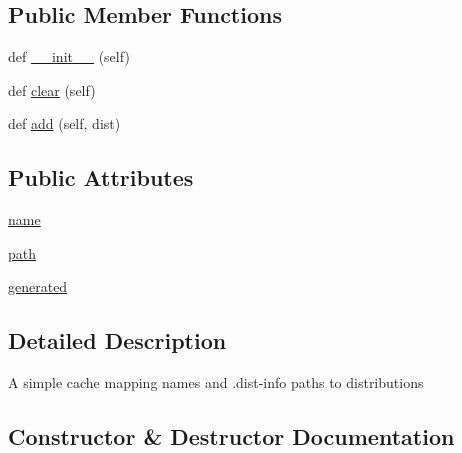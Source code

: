 \subsection*{Public Member Functions}
\begin{DoxyCompactItemize}
\item 
def \hyperlink{classpip_1_1__vendor_1_1distlib_1_1database_1_1__Cache_af54d5616ff89aa6d6ac29816dd0efc6c}{\+\_\+\+\_\+init\+\_\+\+\_\+} (self)
\item 
def \hyperlink{classpip_1_1__vendor_1_1distlib_1_1database_1_1__Cache_ab8493db74feb70354215f9804fafea3d}{clear} (self)
\item 
def \hyperlink{classpip_1_1__vendor_1_1distlib_1_1database_1_1__Cache_a98296c2e1af8395fc035df3fdfc400fc}{add} (self, dist)
\end{DoxyCompactItemize}
\subsection*{Public Attributes}
\begin{DoxyCompactItemize}
\item 
\hyperlink{classpip_1_1__vendor_1_1distlib_1_1database_1_1__Cache_a911ad4649e57201ed0cf218bee86f900}{name}
\item 
\hyperlink{classpip_1_1__vendor_1_1distlib_1_1database_1_1__Cache_a25d54db8a79caad59f7cb87ee68f2b23}{path}
\item 
\hyperlink{classpip_1_1__vendor_1_1distlib_1_1database_1_1__Cache_a8c797172d1f8661efe55f13a8b76c21d}{generated}
\end{DoxyCompactItemize}


\subsection{Detailed Description}
\begin{DoxyVerb}A simple cache mapping names and .dist-info paths to distributions
\end{DoxyVerb}
 

\subsection{Constructor \& Destructor Documentation}
\mbox{\label{classpip_1_1__vendor_1_1distlib_1_1database_1_1__Cache_af54d5616ff89aa6d6ac29816dd0efc6c}} 
